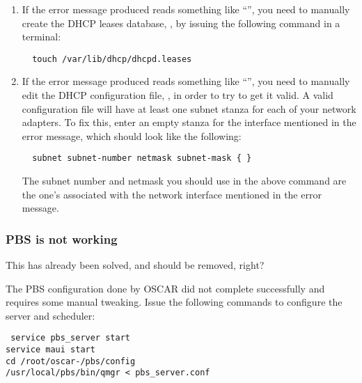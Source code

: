 \begin{enumerate}
\item If the error message produced reads something like
  ``'', you need to manually create
  the DHCP leases database, , by
  issuing the following command in a terminal:

\begin{verbatim}
  touch /var/lib/dhcp/dhcpd.leases
\end{verbatim}
  
\item If the error message produced reads something like ``'', you need to manually edit the DHCP
  configuration file, , in order to try to get
  it valid. A valid configuration file will have at least one subnet
  stanza for each of your network adapters. To fix this, enter an
  empty stanza for the interface mentioned in the error message, which
  should look like the following:

\begin{verbatim}
  subnet subnet-number netmask subnet-mask { }
\end{verbatim}
  
  The subnet number and netmask you should use in the above command
  are the one's associated with the network interface mentioned in the
  error message.
\end{enumerate}

\subsubsection{PBS is not working}

\begin{discuss}
  This has already been solved, and should be removed, right?
\end{discuss}

The PBS configuration done by OSCAR did not complete successfully and
requires some manual tweaking. Issue the following commands to
configure the server and scheduler:

\vspace{11pt}
{\tt
  service pbs\_server start \\
\indent  service maui start \\
\indent  cd /root/oscar-\oscarversion/pbs/config \\
\indent  /usr/local/pbs/bin/qmgr < pbs\_server.conf
}
\vspace{11pt}

